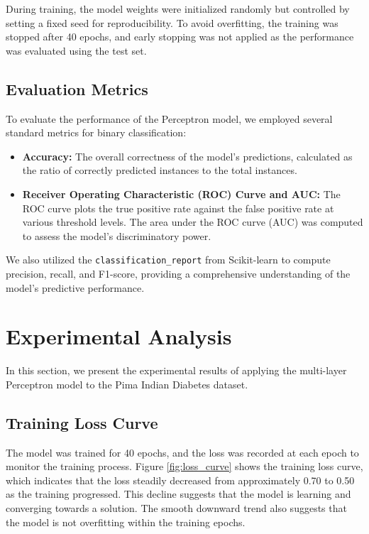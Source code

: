\documentclass[10pt,twocolumn,letterpaper]{article}
\begin{document}
During training, the model weights were initialized randomly but controlled by setting a fixed seed for reproducibility. To avoid overfitting, the training was stopped after 40 epochs, and early stopping was not applied as the performance was evaluated using the test set.

\subsection{Evaluation Metrics}
To evaluate the performance of the Perceptron model, we employed several standard metrics for binary classification:
\begin{itemize}
    \item \textbf{Accuracy:} The overall correctness of the model's predictions, calculated as the ratio of correctly predicted instances to the total instances.
    \item \textbf{Receiver Operating Characteristic (ROC) Curve and AUC:} The ROC curve plots the true positive rate against the false positive rate at various threshold levels. The area under the ROC curve (AUC) was computed to assess the model’s discriminatory power.
\end{itemize}

We also utilized the \texttt{classification\_report} from Scikit-learn to compute precision, recall, and F1-score, providing a comprehensive understanding of the model's predictive performance.
\section{Experimental Analysis}

In this section, we present the experimental results of applying the multi-layer Perceptron model to the Pima Indian Diabetes dataset.

\subsection{Training Loss Curve}
The model was trained for 40 epochs, and the loss was recorded at each epoch to monitor the training process. Figure \ref{fig:loss_curve} shows the training loss curve, which indicates that the loss steadily decreased from approximately 0.70 to 0.50 as the training progressed. This decline suggests that the model is learning and converging towards a solution. The smooth downward trend also suggests that the model is not overfitting within the training epochs.
\end{document}
